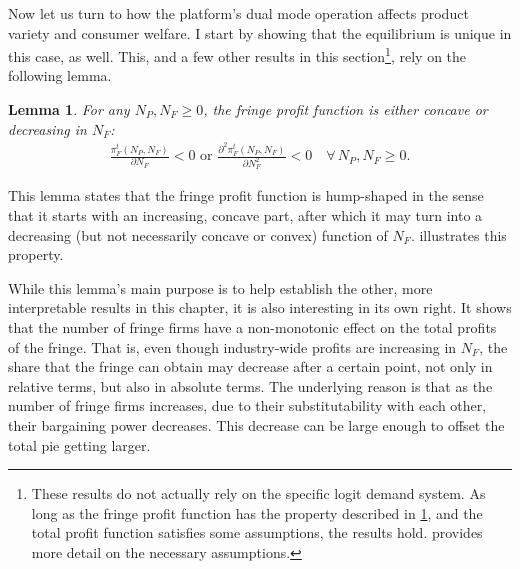 \documentclass[a4paper]{article}
\newtheorem{lemma}{Lemma}
\begin{document}
Now let us turn to how the platform's dual mode operation affects product variety and consumer welfare.
I start by showing that the equilibrium is unique in this case, as well.
This, and a few other results in this section\footnote{
    These results do not actually rely on the specific logit demand system.
    As long as the fringe profit function has the property described in \cref{lem:shape_of_fringe_profit}, and the total profit function satisfies some assumptions, the results hold.
     provides more detail on the necessary assumptions.
}, rely on the following lemma.
\begin{lemma}
    \label{lem:shape_of_fringe_profit}
    For any $N_P, N_F \geq 0$, the fringe profit function is either concave or decreasing in $N_F$:
    \begin{align*}
        \frac{\pi_F^t(N_P, N_F)}{\partial N_F} < 0 \text{ or } \frac{\partial^2 \pi_F^t(N_P, N_F)}{\partial N_F^2} < 0 \quad \forall\, N_P, N_F \geq 0.
    \end{align*}
\end{lemma}
This lemma states that the fringe profit function is hump-shaped in the sense that it starts with an increasing, concave part, after which it may turn into a decreasing (but not necessarily concave or convex) function of $N_F$.
 illustrates this property.

While this lemma's main purpose is to help establish the other, more interpretable results in this chapter, it is also interesting in its own right.
It shows that the number of fringe firms have a non-monotonic effect on the total profits of the fringe.
That is, even though industry-wide profits are increasing in $N_F$, the share that the fringe can obtain may decrease after a certain point, not only in relative terms, but also in absolute terms.
The underlying reason is that as the number of fringe firms increases, due to their substitutability with each other, their bargaining power decreases.
This decrease can be large enough to offset the total pie getting larger.
\end{document}
